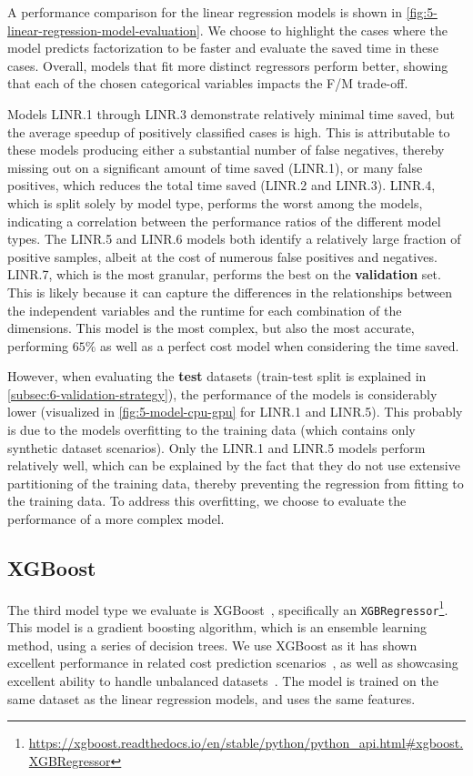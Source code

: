 A performance comparison for the linear regression models is shown in \autoref{fig:5-linear-regression-model-evaluation}. We choose to highlight the cases where the model predicts factorization to be faster and evaluate the saved time in these cases. Overall, models that fit more distinct regressors perform better, showing that each of the chosen categorical variables impacts the F/M trade-off.

Models LINR.1 through LINR.3 demonstrate relatively minimal time saved, but the average speedup of positively classified cases is high. This is attributable to these models producing either a substantial number of false negatives, thereby missing out on a significant amount of time saved (LINR.1), or many false positives, which reduces the total time saved (LINR.2 and LINR.3). LINR.4, which is split solely by model type, performs the worst among the models, indicating a correlation between the performance ratios of the different model types. The LINR.5 and LINR.6 models both identify a relatively large fraction of positive samples, albeit at the cost of numerous false positives and negatives. LINR.7, which is the most granular, performs the best on the \textbf{validation} set. This is likely because it can capture the differences in the relationships between the independent variables and the runtime for each combination of the dimensions. This model is the most complex, but also the most accurate, performing $65\%$ as well as a perfect cost model when considering the time saved.

However, when evaluating the \textbf{test} datasets (train-test split is explained in \autoref{subsec:6-validation-strategy}), the performance of the models is considerably lower (visualized in \autoref{fig:5-model-cpu-gpu} for LINR.1 and LINR.5). This probably is due to the models overfitting to the training data (which contains only synthetic dataset scenarios). Only the LINR.1 and LINR.5 models perform relatively well, which can be explained by the fact that they do not use extensive partitioning of the training data, thereby preventing the regression from fitting to the training data. To address this overfitting, we choose to evaluate the performance of a more complex model.

\subsection{XGBoost}
\label{subsec:5-xgboost}
The third model type we evaluate is XGBoost~\cite{xgboost}, specifically an \texttt{XGBRegressor}\footnote{\url{https://xgboost.readthedocs.io/en/stable/python/python_api.html\#xgboost.XGBRegressor}}. This model is a gradient boosting algorithm, which is an ensemble learning method, using a series of decision trees. We use XGBoost as it has shown excellent performance in related cost prediction scenarios~\cite{tvm}, as well as showcasing excellent ability to handle unbalanced datasets~\cite{xgboost_imbalanced_data}. The model is trained on the same dataset as the linear regression models, and uses the same features.

